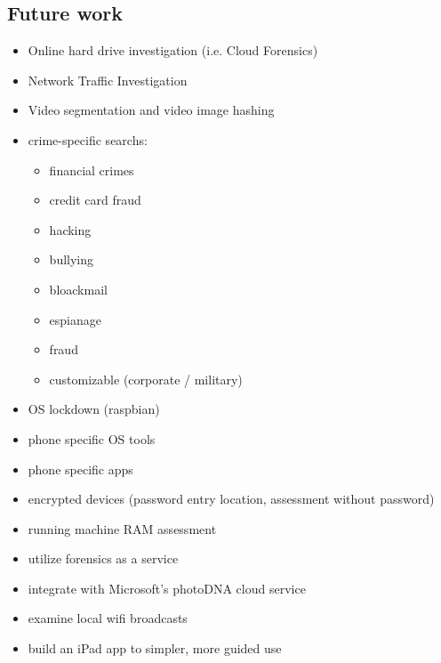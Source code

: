 \documentclass[12pt]{article}
\begin{document}
\subsection{Future work}
\begin{itemize}
  \item Online hard drive investigation (i.e. Cloud Forensics)
  \item Network Traffic Investigation
  \item Video segmentation and video image hashing
  \item crime-specific searchs:
  \begin{itemize}
    \item financial crimes
    \item credit card fraud
    \item hacking
    \item bullying
    \item bloackmail
    \item espianage
    \item fraud
    \item customizable (corporate / military)
  \end{itemize}
  \item OS lockdown (raspbian)
  \item phone specific OS tools
  \item phone specific apps
  \item encrypted devices (password entry location, assessment without password)
  \item running machine RAM assessment
  \item utilize forensics as a service
  \item integrate with Microsoft's photoDNA cloud service
  \item examine local wifi broadcasts
  \item build an iPad app to simpler, more guided use
\end{itemize}

\newpage
\end{document}
